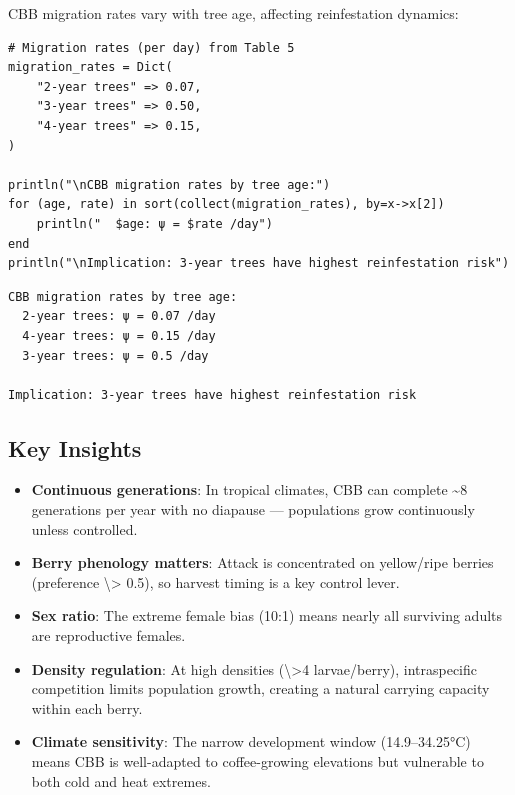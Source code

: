 CBB migration rates vary with tree age, affecting reinfestation dynamics:




\begin{verbatim}
# Migration rates (per day) from Table 5
migration_rates = Dict(
    "2-year trees" => 0.07,
    "3-year trees" => 0.50,
    "4-year trees" => 0.15,
)

println("\nCBB migration rates by tree age:")
for (age, rate) in sort(collect(migration_rates), by=x->x[2])
    println("  $age: ψ = $rate /day")
end
println("\nImplication: 3-year trees have highest reinfestation risk")
\end{verbatim}




\begin{verbatim}
CBB migration rates by tree age:
  2-year trees: ψ = 0.07 /day
  4-year trees: ψ = 0.15 /day
  3-year trees: ψ = 0.5 /day

Implication: 3-year trees have highest reinfestation risk
\end{verbatim}



\subsection{Key Insights}



\label{7549919537174593161}{}


\begin{itemize}
\item[1. ] \textbf{Continuous generations}: In tropical climates, CBB can complete  {\textasciitilde}8 generations per year with no diapause — populations grow  continuously unless controlled.


\item[2. ] \textbf{Berry phenology matters}: Attack is concentrated on yellow/ripe  berries (preference {\textbackslash}> 0.5), so harvest timing is a key control  lever.


\item[3. ] \textbf{Sex ratio}: The extreme female bias (10:1) means nearly all  surviving adults are reproductive females.


\item[4. ] \textbf{Density regulation}: At high densities ({\textbackslash}>4 larvae/berry),  intraspecific competition limits population growth, creating a  natural carrying capacity within each berry.


\item[5. ] \textbf{Climate sensitivity}: The narrow development window  (14.9–34.25°C) means CBB is well-adapted to coffee-growing  elevations but vulnerable to both cold and heat extremes.

\end{itemize}


